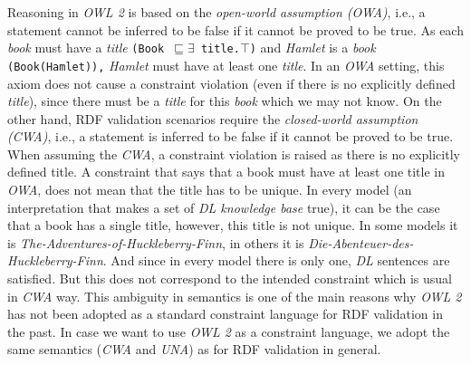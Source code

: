 \documentclass[a4paper,fontsize=11pt]{scrartcl}
\newcommand{\tb}[1]{\todo[size=\small, color=green!40]{\textbf{Thomas:} #1}}
\newcommand{\ms}[1]{\texttt{#1}}
\begin{document}
Reasoning in \emph{OWL 2} is based on the {\em open-world assumption (OWA)}, i.e., a statement cannot be inferred to be false if it cannot be proved to be true. 
As each \emph{book} must have a \emph{title} {\small\ms{(Book $\sqsubseteq \exists$ title.$\top$)}} and {\em Hamlet} is a \emph{book} {\small\ms{(Book(Hamlet)),}}
{\em Hamlet} must have at least one \emph{title}.
In an \emph{OWA} setting, this axiom does not cause a constraint violation (even if there is no explicitly defined \emph{title}), since there must be a \emph{title} for this \emph{book} which we may not know. 
On the other hand, RDF validation scenarios require the \emph{closed-world assumption (CWA)}, i.e., a statement is inferred to be false if it cannot be proved to be true.
When assuming the \emph{CWA}, a constraint violation is raised as there is no explicitly defined title. 
A constraint that says that a book must have at least one title in \emph{OWA}, 
does not mean that the title has to be unique. 
In every model  (an interpretation that makes a set of \emph{DL knowledge base} true), 
it can be the case that a book has a single title, however, 
this title is not unique. 
In some models it is \emph{The-Adventures-of-Huckleberry-Finn}, in others it is \emph{Die-Abenteuer-des-Huckleberry-Finn}. 
And since in every model there is only one, \emph{DL} sentences are satisfied. 
But this does not correspond to the intended constraint which is usual in \emph{CWA} way.   
This ambiguity in semantics is one of the main reasons why \emph{OWL 2} has not been adopted as a standard constraint language for RDF validation in the past. 
In case we want to use \emph{OWL 2} as a constraint language, we adopt the same semantics (\emph{CWA} and \emph{UNA}) as for RDF validation in general. 
\end{document}

